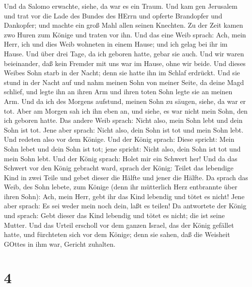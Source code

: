  Und da Salomo erwachte, siehe, da war es ein Traum. Und
kam gen Jerusalem und trat vor die Lade des Bundes des HErrn und opferte
Brandopfer und Dankopfer; und machte ein groß Mahl allen seinen
Knechten.  Zu der Zeit kamen zwo Huren zum Könige und
traten vor ihn.  Und das eine Weib sprach: Ach, mein Herr,
ich und dies Weib wohneten in einem Hause; und ich gelag bei ihr im
Hause.  Und über drei Tage, da ich geboren hatte, gebar sie
auch. Und wir waren beieinander, daß kein Fremder mit uns war im Hause,
ohne wir beide.  Und dieses Weibes Sohn starb in der Nacht;
denn sie hatte ihn im Schlaf erdrückt.  Und sie stund in
der Nacht auf und nahm meinen Sohn von meiner Seite, da deine Magd
schlief, und legte ihn an ihren Arm und ihren toten Sohn legte sie an
meinen Arm.  Und da ich des Morgens aufstund, meinen Sohn
zu säugen, siehe, da war er tot. Aber am Morgen sah ich ihn eben an, und
siehe, es war nicht mein Sohn, den ich geboren hatte.  Das
andere Weib sprach: Nicht also, mein Sohn lebt und dein Sohn ist tot.
Jene aber sprach: Nicht also, dein Sohn ist tot und mein Sohn lebt. Und
redeten also vor dem Könige.  Und der König sprach: Diese
spricht: Mein Sohn lebet und dein Sohn ist tot; jene spricht: Nicht
also, dein Sohn ist tot und mein Sohn lebt.  Und der König
sprach: Holet mir ein Schwert her! Und da das Schwert vor den König
gebracht ward,  sprach der König: Teilet das lebendige Kind
in zwei Teile und gebet dieser die Hälfte und jener die Hälfte.
 Da sprach das Weib, des Sohn lebete, zum Könige (denn ihr
mütterlich Herz entbrannte über ihren Sohn): Ach, mein Herr, gebt ihr
das Kind lebendig und tötet es nicht! Jene aber sprach: Es sei weder
mein noch dein, laßt es teilen!  Da antwortete der König
und sprach: Gebt dieser das Kind lebendig und tötet es nicht; die ist
seine Mutter.  Und das Urteil erscholl vor dem ganzen
Israel, das der König gefället hatte, und fürchteten sich vor dem
Könige; denn sie sahen, daß die Weisheit GOttes in ihm war, Gericht
zuhalten.

\hypertarget{section-3}{%
\section{4}\label{section-3}}


